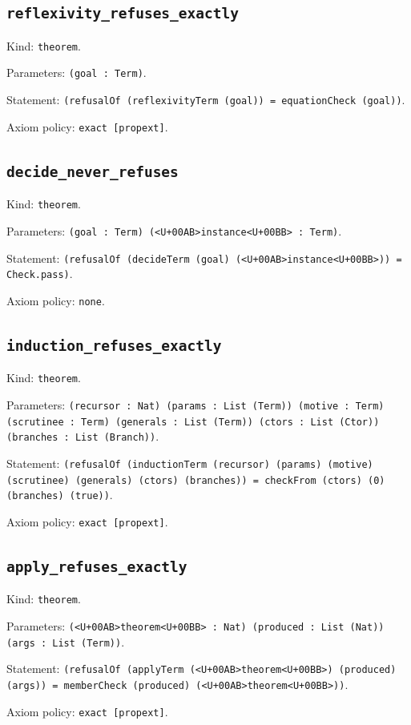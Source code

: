 \documentclass[11pt]{article}
\begin{document}
\subsection*{\texttt{reflexivity\_refuses\_exactly}}
\noindent Kind: \texttt{theorem}.\par
\noindent Parameters: \texttt{(goal : Term)}.\par
\noindent Statement: \texttt{(refusalOf (reflexivityTerm (goal)) = equationCheck (goal))}.\par
\noindent Axiom policy: \texttt{exact [propext]}.\par
\subsection*{\texttt{decide\_never\_refuses}}
\noindent Kind: \texttt{theorem}.\par
\noindent Parameters: \texttt{(goal : Term) (<U+00AB>instance<U+00BB> : Term)}.\par
\noindent Statement: \texttt{(refusalOf (decideTerm (goal) (<U+00AB>instance<U+00BB>)) = Check.pass)}.\par
\noindent Axiom policy: \texttt{none}.\par
\subsection*{\texttt{induction\_refuses\_exactly}}
\noindent Kind: \texttt{theorem}.\par
\noindent Parameters: \texttt{(recursor : Nat) (params : List (Term)) (motive : Term) (scrutinee : Term) (generals : List (Term)) (ctors : List (Ctor)) (branches : List (Branch))}.\par
\noindent Statement: \texttt{(refusalOf (inductionTerm (recursor) (params) (motive) (scrutinee) (generals) (ctors) (branches)) = checkFrom (ctors) (0) (branches) (true))}.\par
\noindent Axiom policy: \texttt{exact [propext]}.\par
\subsection*{\texttt{apply\_refuses\_exactly}}
\noindent Kind: \texttt{theorem}.\par
\noindent Parameters: \texttt{(<U+00AB>theorem<U+00BB> : Nat) (produced : List (Nat)) (args : List (Term))}.\par
\noindent Statement: \texttt{(refusalOf (applyTerm (<U+00AB>theorem<U+00BB>) (produced) (args)) = memberCheck (produced) (<U+00AB>theorem<U+00BB>))}.\par
\noindent Axiom policy: \texttt{exact [propext]}.\par
\end{document}
